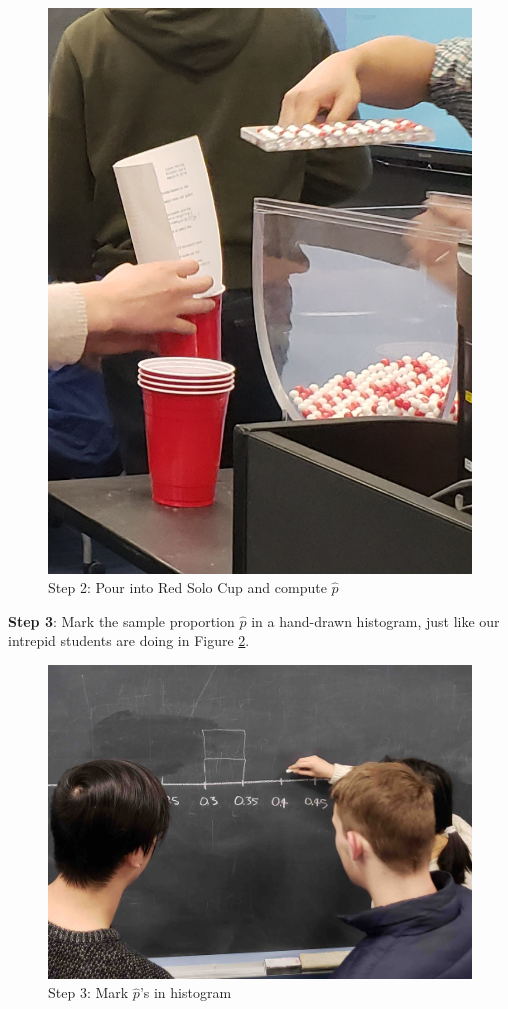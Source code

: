 \documentclass[12pt,]{krantz}
\theoremstyle{definition}
\theoremstyle{definition}
\theoremstyle{definition}
\theoremstyle{remark}
\begin{document}
\begin{figure}

{\centering \includegraphics[width=0.8\linewidth]{images/sampling/tactile_2_a} 

}

\caption{Step 2: Pour into Red Solo Cup and compute $\widehat{p}$}\label{fig:tactile2}
\end{figure}

\textbf{Step 3}: Mark the sample proportion \(\widehat{p}\) in a
hand-drawn histogram, just like our intrepid students are doing in
Figure \ref{fig:tactile3}.

\begin{figure}

{\centering \includegraphics[width=0.8\linewidth]{images/sampling/tactile_3_a} 

}

\caption{Step 3: Mark $\widehat{p}$'s in histogram}\label{fig:tactile3}
\end{figure}
\end{document}
